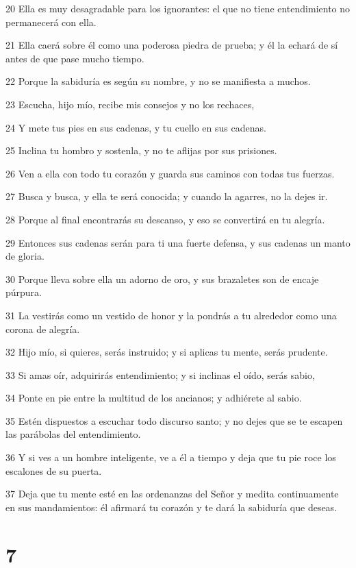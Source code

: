 \par 20 Ella es muy desagradable para los ignorantes: el que no tiene entendimiento no permanecerá con ella.
\par 21 Ella caerá sobre él como una poderosa piedra de prueba; y él la echará de sí antes de que pase mucho tiempo.
\par 22 Porque la sabiduría es según su nombre, y no se manifiesta a muchos.
\par 23 Escucha, hijo mío, recibe mis consejos y no los rechaces,
\par 24 Y mete tus pies en sus cadenas, y tu cuello en sus cadenas.
\par 25 Inclina tu hombro y sostenla, y no te aflijas por sus prisiones.
\par 26 Ven a ella con todo tu corazón y guarda sus caminos con todas tus fuerzas.
\par 27 Busca y busca, y ella te será conocida; y cuando la agarres, no la dejes ir.
\par 28 Porque al final encontrarás su descanso, y eso se convertirá en tu alegría.
\par 29 Entonces sus cadenas serán para ti una fuerte defensa, y sus cadenas un manto de gloria.
\par 30 Porque lleva sobre ella un adorno de oro, y sus brazaletes son de encaje púrpura.
\par 31 La vestirás como un vestido de honor y la pondrás a tu alrededor como una corona de alegría.
\par 32 Hijo mío, si quieres, serás instruido; y si aplicas tu mente, serás prudente.
\par 33 Si amas oír, adquirirás entendimiento; y si inclinas el oído, serás sabio,
\par 34 Ponte en pie entre la multitud de los ancianos; y adhiérete al sabio.
\par 35 Estén dispuestos a escuchar todo discurso santo; y no dejes que se te escapen las parábolas del entendimiento.
\par 36 Y si ves a un hombre inteligente, ve a él a tiempo y deja que tu pie roce los escalones de su puerta.
\par 37 Deja que tu mente esté en las ordenanzas del Señor y medita continuamente en sus mandamientos: él afirmará tu corazón y te dará la sabiduría que deseas.

\chapter{7}

